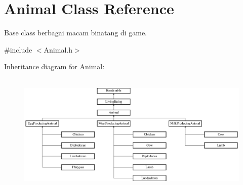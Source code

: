 \hypertarget{classAnimal}{}\section{Animal Class Reference}
\label{classAnimal}


Base class berbagai macam binatang di game.  




{\ttfamily \#include $<$Animal.\+h$>$}

Inheritance diagram for Animal\+:\begin{figure}[H]
\begin{center}
\leavevmode
\includegraphics[height=5.833333cm]{classAnimal}
\end{center}
\end{figure}
